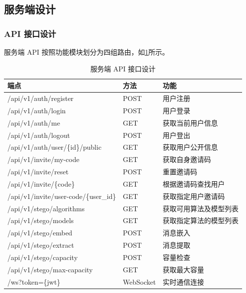 \subsection{服务端设计}

\subsubsection{API 接口设计}

服务端 API 按照功能模块划分为四组路由，如\cref{tab:api}所示。

\begin{table}[htb!]
    \caption{服务端 API 接口设计}
    \centering
    \begin{tabular}{llp{5cm}}
        \hline
        \textbf{端点} & \textbf{方法} & \textbf{功能} \\
        \hline
        /api/v1/auth/register & POST & 用户注册 \\
        /api/v1/auth/login & POST & 用户登录 \\
        /api/v1/auth/me & GET & 获取当前用户信息 \\
        /api/v1/auth/logout & POST & 用户登出 \\
        /api/v1/auth/user/\{id\}/public & GET & 获取用户公开信息 \\
        \hline
        /api/v1/invite/my-code & GET & 获取自身邀请码 \\
        /api/v1/invite/reset & POST & 重置邀请码 \\
        /api/v1/invite/\{code\} & GET & 根据邀请码查找用户 \\
        /api/v1/invite/user-code/\{user\_id\} & GET & 获取指定用户邀请码 \\
        \hline
        /api/v1/stego/algorithms & GET & 获取可用算法及模型列表 \\
        /api/v1/stego/models & GET & 获取指定算法的模型列表 \\
        /api/v1/stego/embed & POST & 消息嵌入 \\
        /api/v1/stego/extract & POST & 消息提取 \\
        /api/v1/stego/capacity & POST & 容量检查 \\
        /api/v1/stego/max-capacity & GET & 获取最大容量 \\
        \hline
        /ws?token=\{jwt\} & WebSocket & 实时通信连接 \\
        \hline
    \end{tabular}
    \label{tab:api}
\end{table}

